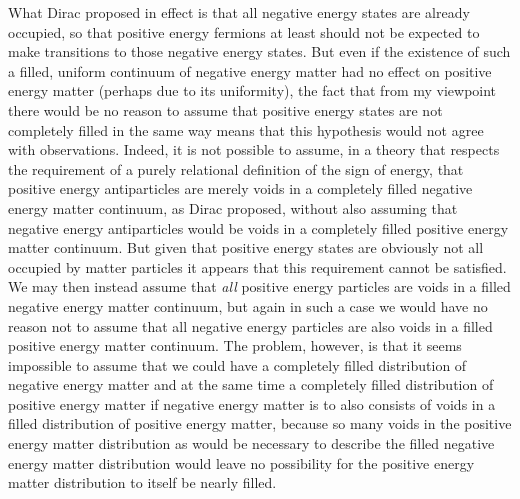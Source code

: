 \documentclass[notitlepage,12pt]{report}
\begin{document}
What Dirac proposed in effect is that all negative energy states are already occupied, so that positive energy fermions at least should not be expected to make transitions to those negative energy states. But even if the existence of such a filled, uniform continuum of negative energy matter had no effect on positive energy matter (perhaps due to its uniformity), the fact that from my viewpoint there would be no reason to assume that positive energy states are not completely filled in the same way means that this hypothesis would not agree with observations. Indeed, it is not possible to assume, in a theory that respects the requirement of a purely relational definition of the sign of energy, that positive energy antiparticles are merely voids in a completely filled negative energy matter continuum, as Dirac proposed, without also assuming that negative energy antiparticles would be voids in a completely filled positive energy matter continuum. But given that positive energy states are obviously not all occupied by matter particles it appears that this requirement cannot be satisfied. We may then instead assume that \textit{all} positive energy particles are voids in a filled negative energy matter continuum, but again in such a case we would have no reason not to assume that all negative energy particles are also voids in a filled positive energy matter continuum. The problem, however, is that it seems impossible to assume that we could have a completely filled distribution of negative energy matter and at the same time a completely filled distribution of positive energy matter if negative energy matter is to also consists of voids in a filled distribution of positive energy matter, because so many voids in the positive energy matter distribution as would be necessary to describe the filled negative energy matter distribution would leave no possibility for the positive energy matter distribution to itself be nearly filled.
\end{document}
